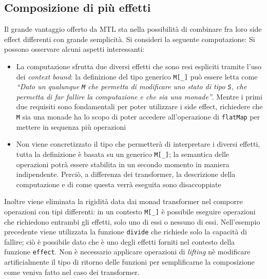 \subsection{Composizione di più effetti}
\label{sub:composizione-di-piu-effetti}
Il grande vantaggio offerto da MTL sta nella possibilità di combinare fra loro side effect differenti con grande semplicità. Si consideri la seguente computazione:
Si possono osservare alcuni aspetti interessanti:
\begin{itemize}
  \item La computazione sfrutta due diversi effetti che sono resi espliciti tramite l'uso dei \emph{context bound}: la definizione del tipo generico \lstinline{M[_]} può essere letta come \emph{``Dato un qualunque \lstinline{M} che permetta di modificare uno stato di tipo \lstinline{S}, che permetta di far fallire la computazione e che sia una monade''}. Mentre i primi due requisiti sono fondamentali per poter utilizzare i side effect, richiedere che \lstinline{M} sia una monade ha lo scopo di poter accedere all'operazione di \lstinline{flatMap} per mettere in sequenza più operazioni
  \item Non viene concretizzato il tipo che permetterà di interpretare i diversi effetti, tutta la definizione è basata su un generico \lstinline{M[_]}; la semantica delle operazioni potrà essere stabilita in un secondo momento in maniera indipendente. Perciò, a differenza dei transformer, la descrizione della computazione e di come questa verrà eseguita sono disaccoppiate
\end{itemize}

Inoltre viene eliminata la rigidità data dai monad transformer nel comporre operazioni con tipi differenti: in un contesto \lstinline{M[_]} è possibile eseguire operazioni che richiedono entrambi gli effetti, solo uno di essi o nessuno di essi. Nell'esempio precedente viene utilizzata la funzione \lstinline{divide} che richiede solo la capacità di fallire; ciò è possibile dato che è uno degli effetti forniti nel contesto della funzione \lstinline{effect}. Non è necessario applicare operazioni di \emph{lifting} nè modificare artificialmente il tipo di ritorno delle funzioni per semplificarne la composizione come veniva fatto nel caso dei transformer.

